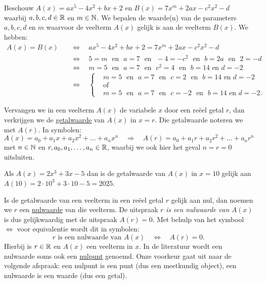 \documentclass{ximera}
\begin{document}
\begin{example} 
Beschouw $A(x) = ax^5 - 4x^2 + bx + 2$ en $B(x) = 7x^m + 2ax - c^2x^2 - d$ waarbij $a,b,c,d \in \mathbb{R}$ en $m \in \mathbb{N}$. We bepalen de waarde(n) van de parameters $a,b,c,d$ en $m$ waarvoor de veelterm $A(x)$ gelijk is aan de veelterm $B(x)$. We hebben: 
\begin{align*}
A(x) = B(x) \quad 
& \Leftrightarrow \quad ax^5 - 4x^2 + bx + 2 = 7x^m + 2ax - c^2x^2 - d \\
& \Leftrightarrow \quad 5 = m \,\,\text{ en }\,\, a = 7 \,\,\text{ en }\,\, -4 = -c^2 \,\,\text{ en }\,\, b = 2a \,\,\text{ en }\,\, 2 = -d \\
& \Leftrightarrow \quad m=5 \,\,\text{ en }\,\, a = 7 \,\,\text{ en }\,\, c^2 = 4 \,\,\text{ en }\,\, b = 14 \text{ en } d = -2 \\
& \Leftrightarrow \quad 
\left\{
\begin{aligned}
& m=5 \,\,\text{ en }\,\, a = 7 \,\,\text{ en }\,\, c = 2 \,\,\text{ en }\,\, b = 14 \text{ en } d = -2 \\
& \text{of} \\
& m=5 \,\,\text{ en }\,\, a = 7 \,\,\text{ en }\,\, c = -2 \,\,\text{ en }\,\, b = 14 \text{ en } d = -2.
\end{aligned}
\right.
\end{align*}
\end{example} 

Vervangen we in een veelterm $A(x)$ de variabele $x$ door een re\"eel getal $r$, dan verkrijgen we de \underline{getalwaarde} van $A(x)$ in $x = r$. Die getalwaarde noteren we met $A(r)$. In symbolen:
\[
A(x) = a_0 + a_1x + a_2x^2 + \dots + a_n x^n \quad 
\Rightarrow
\quad A(r) = a_0 + a_1 r + a_2r^2 + \dots + a_n r^n
\]
met $n \in \mathbb{N}$ en $r, a_0, a_1, \ldots, a_n \in \mathbb{R}$, waarbij we ook hier het geval $n = r = 0$ uitsluiten. %

\begin{example} 
Als $A(x) = 2x^3+3x-5$ dan is de getalwaarde van $A(x)$ in $x = 10$ gelijk aan $A(10) = 2\cdot 10^3 + 3 \cdot 10 - 5 = 2025$.
\end{example} 

Is de getalwaarde van een veelterm in een re\"eel getal $r$ gelijk aan nul, dan noemen we $r$ een \underline{nulwaarde}  van die veelterm. De uitspraak {\em $r$ is een nulwaarde van $A(x)$} is dus gelijkwaardig met de uitspraak {\em $A(r) = 0$}. Met behulp van het symbool $\Leftrightarrow$ voor equivalentie wordt dit in symbolen:
\[
r \text{ is een nulwaarde van } A(x) \quad \Leftrightarrow \quad A(r) = 0.
\]
Hierbij is $r \in \mathbb{R}$ en $A(x)$ een veelterm in $x$. In de literatuur wordt een nulwaarde soms ook een \underline{nulpunt} genoemd. Onze voorkeur gaat uit naar de volgende afspraak: een nulpunt is een punt (dus een meetkundig object), een nulwaarde is een waarde (dus een getal).
\end{document}
